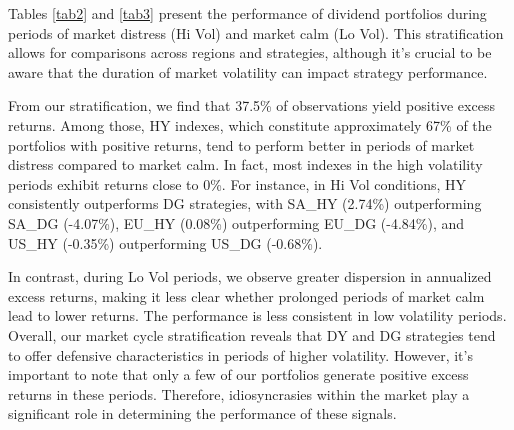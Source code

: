 \documentclass[11pt,preprint, authoryear]{elsarticle}
\numberwithin{equation}{section}
\numberwithin{figure}{section}
\numberwithin{table}{section}
\begin{document}
Tables \ref{tab2} and \ref{tab3} present the performance of dividend
portfolios during periods of market distress (Hi Vol) and market calm
(Lo Vol). This stratification allows for comparisons across regions and
strategies, although it's crucial to be aware that the duration of
market volatility can impact strategy performance.

From our stratification, we find that 37.5\% of observations yield
positive excess returns. Among those, HY indexes, which constitute
approximately 67\% of the portfolios with positive returns, tend to
perform better in periods of market distress compared to market calm. In
fact, most indexes in the high volatility periods exhibit returns close
to 0\%. For instance, in Hi Vol conditions, HY consistently outperforms
DG strategies, with SA\_HY (2.74\%) outperforming SA\_DG (-4.07\%),
EU\_HY (0.08\%) outperforming EU\_DG (-4.84\%), and US\_HY (-0.35\%)
outperforming US\_DG (-0.68\%).

In contrast, during Lo Vol periods, we observe greater dispersion in
annualized excess returns, making it less clear whether prolonged
periods of market calm lead to lower returns. The performance is less
consistent in low volatility periods. Overall, our market cycle
stratification reveals that DY and DG strategies tend to offer defensive
characteristics in periods of higher volatility. However, it's important
to note that only a few of our portfolios generate positive excess
returns in these periods. Therefore, idiosyncrasies within the market
play a significant role in determining the performance of these signals.
\end{document}

